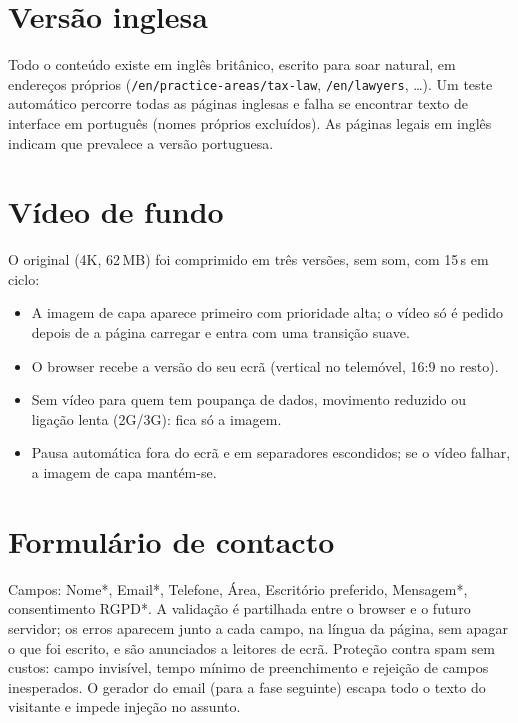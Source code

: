 \documentclass[11pt,a4paper]{article}
\begin{document}
\section{Versão inglesa}\label{sec:ingles}
Todo o conteúdo existe em inglês britânico, escrito para soar natural, em endereços próprios
(\texttt{/en/practice-areas/tax-law}, \texttt{/en/lawyers}, \ldots). Um teste automático percorre todas as
páginas inglesas e falha se encontrar texto de interface em português (nomes próprios excluídos). As páginas
legais em inglês indicam que prevalece a versão portuguesa.

\section{Vídeo de fundo}
O original (4K, 62\,MB) foi comprimido em três versões, sem som, com 15\,s em ciclo:
\begin{center}\resVideoTable\end{center}
\begin{itemize}
  \item A imagem de capa aparece primeiro com prioridade alta; o vídeo só é pedido depois de a página carregar e entra com uma transição suave.
  \item O browser recebe a versão do seu ecrã (vertical no telemóvel, 16:9 no resto).
  \item Sem vídeo para quem tem poupança de dados, movimento reduzido ou ligação lenta (2G/3G): fica só a imagem.
  \item Pausa automática fora do ecrã e em separadores escondidos; se o vídeo falhar, a imagem de capa mantém-se.
\end{itemize}
\begin{center}\resPosterTable\end{center}

\section{Formulário de contacto}
Campos: Nome*, Email*, Telefone, Área, Escritório preferido, Mensagem*, consentimento RGPD*. A validação é
partilhada entre o browser e o futuro servidor; os erros aparecem junto a cada campo, na língua da página,
sem apagar o que foi escrito, e são anunciados a leitores de ecrã. Proteção contra spam sem custos: campo
invisível, tempo mínimo de preenchimento e rejeição de campos inesperados. O gerador do email (para a fase
seguinte) escapa todo o texto do visitante e impede injeção no assunto.
\end{document}
